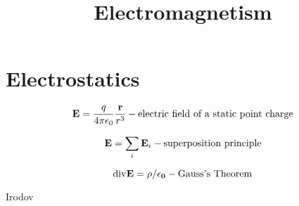 \documentclass[twoside,10pt]{article}
\title{\Large \bf Electromagnetism}
\date{}
\begin{document}
\maketitle

\vspace*{-2cm}




\section{Electrostatics}

\begin{equation}
{\bf E} = \frac{q}{4 \pi \epsilon_0} \frac{\bf r}{r^3} - \textrm{electric field of a static point charge}
\end{equation}

\begin{equation}
{\bf E} = \sum_i {\bf E}_i - \textrm{superposition principle}
\end{equation}

\begin{equation}
{\rm div} \bf {E} = \rho/\epsilon_0 - \textrm{Gauss's Theorem}
\end{equation}





\begin{thebibliography}{99}

 Irodov

\end{thebibliography}
\end{document}
